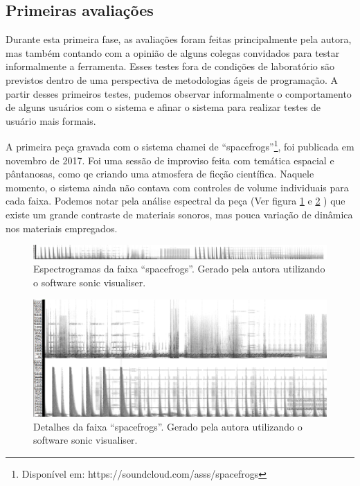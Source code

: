 \subsection{Primeiras avaliações}

Durante esta primeira fase, as avaliações foram feitas principalmente pela autora, mas também contando com a opinião de alguns colegas convidados para testar informalmente a ferramenta. Esses testes fora de condições de laboratório são previstos dentro de uma perspectiva de metodologias ágeis de programação. A partir desses primeiros testes, pudemos observar informalmente o comportamento de alguns usuários com o sistema e afinar o sistema para realizar testes de usuário mais formais. 

A primeira peça gravada com o sistema chamei de ``spacefrogs''\footnote{Disponível em: https://soundcloud.com/asss/spacefrogs}, foi publicada em novembro de 2017. Foi uma sessão de improviso feita com temática espacial e pântanosas, como qe criando uma atmosfera de ficção científica. Naquele momento, o sistema ainda não contava com controles de volume individuais para cada faixa. Podemos notar pela análise espectral da peça (Ver figura \ref{fig:spacefrogs} e \ref{fig:spacefrogsdt} ) que existe um grande contraste de materiais sonoros, mas pouca variação de dinâmica nos materiais empregados.

\begin{figure}

\includegraphics[width=1\textwidth]{pictures/cap4/spacefrogs_spectrogram}
\caption{Espectrogramas da faixa ``spacefrogs''. Gerado pela autora utilizando o software sonic visualiser.}
\label{fig:spacefrogs}
\end{figure}

\begin{figure}

\includegraphics[width=1\textwidth]{pictures/cap4/spacefrogs_spectrogram_dt}
\caption{Detalhes da faixa ``spacefrogs''. Gerado pela autora utilizando o software sonic visualiser.}
\label{fig:spacefrogsdt}
\end{figure}



